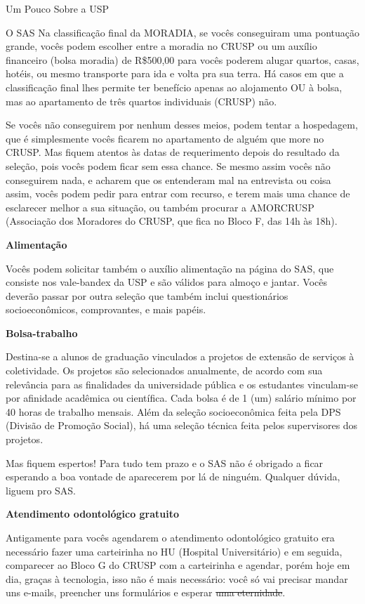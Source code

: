 \begin{secao}{Um Pouco Sobre a USP}
\begin{subsecao}{O SAS}
Na classificação final da MORADIA, se vocês conseguiram uma pontuação grande, vocês
podem escolher entre a moradia no CRUSP ou um auxílio financeiro (bolsa moradia)
de R\$500,00 para vocês poderem alugar quartos, casas, hotéis, ou mesmo transporte
para ida e volta pra sua terra. Há casos em que a classificação final lhes permite
ter benefício apenas ao alojamento OU à bolsa, mas ao apartamento de três quartos
individuais (CRUSP) não.

Se vocês não conseguirem por nenhum desses meios, podem tentar a hospedagem, que é
simplesmente vocês ficarem no apartamento de alguém que more no CRUSP. Mas fiquem
atentos às datas de requerimento depois do resultado da seleção, pois vocês podem
ficar sem essa chance. Se mesmo assim vocês não conseguirem nada,
e acharem que os entenderam mal na entrevista ou coisa assim, vocês podem pedir para
entrar com recurso, e terem mais uma chance de esclarecer melhor a sua situação, ou também
procurar a AMORCRUSP (Associação dos Moradores do CRUSP, que fica no Bloco F, das 14h às 18h).

{\bf Alimentação}

Vocês podem solicitar também o auxílio alimentação na página do SAS, que
consiste nos vale-bandex da USP e são válidos para almoço e jantar. Vocês deverão
passar por outra seleção que também inclui questionários socioeconômicos,
comprovantes, e mais papéis.

{\bf Bolsa-trabalho}

Destina-se a alunos de graduação vinculados a projetos de extensão de serviços à
coletividade. Os projetos são selecionados anualmente, de acordo com sua relevância
para as finalidades da universidade pública e os estudantes vinculam-se por
afinidade acadêmica ou científica. Cada bolsa é de 1 (um) salário mínimo por
40 horas de trabalho mensais. Além da seleção socioeconômica feita pela
DPS (Divisão de Promoção Social), há uma seleção técnica feita pelos supervisores
dos projetos.

Mas fiquem espertos! Para tudo tem prazo e o SAS não é obrigado a ficar esperando a
boa vontade de aparecerem por lá de ninguém. Qualquer dúvida, liguem pro SAS.

{\bf Atendimento odontológico gratuito}

Antigamente para vocês agendarem o atendimento odontológico gratuito era necessário fazer uma
carteirinha no HU (Hospital Universitário) e em seguida, comparecer ao Bloco G
do CRUSP com a carteirinha e agendar, porém hoje em dia, graças à tecnologia,
isso não é mais necessário: você só vai precisar mandar uns e-mails, preencher uns
formulários e esperar \sout{uma eternidade}.


\end{subsecao}
\end{secao}
